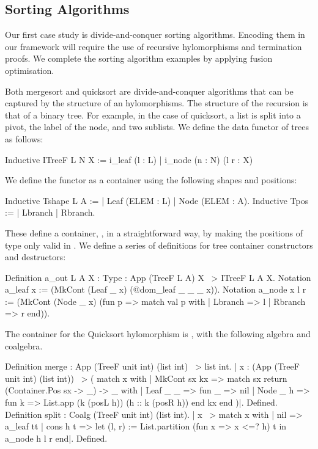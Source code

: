 \documentclass[a4paper,anonymous, UKenglish,cleveref, autoref, thm-restate]{lipics-v2021}
\newcommand{\mpav}[1]{\textcolor{red}{\textsc{Marco}: #1}}
\begin{document}
\subsection{Sorting Algorithms}\label{sec:sorting}
Our first case study is divide-and-conquer sorting algorithms.  Encoding them
in our framework will require the use of recursive hylomorphisms and
termination proofs.  We complete the sorting algorithm examples by applying
fusion optimisation.

Both mergesort and quicksort are divide-and-conquer algorithms that can be
captured by the structure of an hylomorphisms. The structure of the recursion
is that of a binary tree.  For example, in the case of quicksort, a list is
split into a pivot, the label of the node, and two sublists. We define the data
functor of trees as follows:
\begin{coqcode}
Inductive ITreeF L N X := i_leaf (l : L) | i_node (n : N) (l r : X)
\end{coqcode}
We define the functor as a container using the following shapes and positions:
\begin{coqcode}
Inductive Tshape L A := | Leaf (ELEM : L) | Node (ELEM : A).
Inductive Tpos := | Lbranch | Rbranch. 
\end{coqcode}
These define a container, , in a straightforward way, by making
the positions of type  only valid in .
We define a series of definitions for tree container constructors and 
destructors:
\begin{coqcode}
Definition a_out {L A X : Type} : App (TreeF L A) X ~> ITreeF L A X.
Notation a_leaf x := (MkCont (Leaf _ x) (@dom_leaf _ _ _ x)).
Notation a_node x l r := (MkCont (Node _ x)
  (fun p => match val p with | Lbranch => l | Rbranch => r end)).
\end{coqcode}
The container for the Quicksort hylomorphism is , with
the following algebra and coalgebra.
\begin{coqcode}
  Definition merge : App (TreeF unit int) (list int) ~> list int.
|{ x : (App (TreeF unit int) (list int)) ~> (
           match x with
           | MkCont sx kx =>
               match sx return (Container.Pos sx -> _) -> _ with
               | Leaf _ _ => fun _ => nil
               | Node _ h => fun k => List.app (k (posL h)) (h :: k (posR h))
               end kx
           end
  )}|.
Defined.
Definition split : Coalg (TreeF unit int) (list int).
|{ x ~> match x with
        | nil => a_leaf tt
        | cons h t => let (l, r) := List.partition (fun x => x <=? h) t in
                      a_node h l r
        end}|.
Defined.
\end{coqcode}
\end{document}
